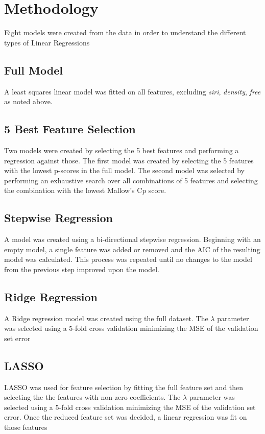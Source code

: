 \documentclass[12pt,letterpaper]{article}
\begin{document}
\section*{Methodology}

Eight models were created from the data in order to understand the different types of Linear Regressions

\subsection*{Full Model}
A least squares linear model was fitted on all features, excluding \textit{siri}, \textit{density}, \textit{free} as noted above.

\subsection*{5 Best Feature Selection}
Two models were created by selecting the 5 best features and performing a regression against those. The first model was created by selecting the 5 features with the lowest p-scores in the full model. The second model was selected by performing an exhaustive search over all combinations of 5 features and selecting the combination with the lowest Mallow's Cp score. 

\subsection*{Stepwise Regression}
A model was created using a bi-directional stepwise regression. Beginning with an empty model, a single feature was added or removed and the AIC of the resulting model was calculated. This process was repeated until no changes to the model from the previous step improved upon the model. 

\subsection*{Ridge Regression}
A Ridge regression model was created using the full dataset. The $\lambda$ parameter was selected using a 5-fold cross validation minimizing the MSE of the validation set error

\subsection*{LASSO}
LASSO was used for feature selection by fitting the full feature set and then selecting the the features with non-zero coefficients. The $\lambda$ parameter was selected using a 5-fold cross validation minimizing the MSE of the validation set error. Once the reduced feature set was decided, a linear regression was fit on those features
\end{document}
